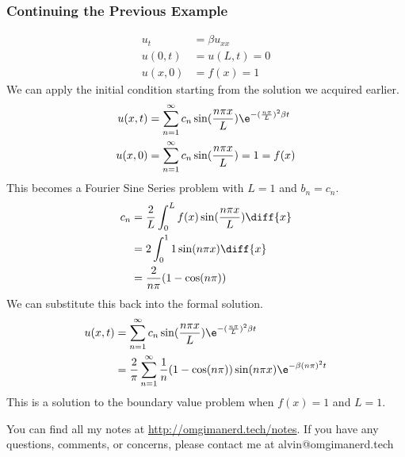 \documentclass{math}
\begin{document}
\subsubsection*{Continuing the Previous Example}
\begin{align*}
  u_t &= \beta u_{xx} \\
  u(0,t) &= u(L,t) = 0 \\
  u(x,0) &= f(x) = 1
\end{align*}
We can apply the initial condition starting from the solution we acquired
earlier.
\begin{align*}
  u(x,t) &= \sum_{n=1}^{\infty}c_n\sin(\frac{n\pi x}{L})
    \e^{-(\frac{n\pi}{L})^2\beta t} \\
  u(x,0) &= \sum_{n=1}^{\infty}c_n\sin(\frac{n\pi x}{L}) = 1 = f(x)
\end{align*}
This becomes a Fourier Sine Series problem with \( L = 1 \) and \( b_n = c_n \).
\begin{align*}
  c_n &= \frac{2}{L}\int_{0}^{L}f(x)\sin(\frac{n\pi x}{L})\diff{x} \\
  &= 2\int_{0}^{1}1\sin(n\pi x)\diff{x} \\
  &= \frac{2}{n\pi}(1-\cos(n\pi))
\end{align*}
We can substitute this back into the formal solution.
\begin{align*}
  u(x,t) &= \sum_{n=1}^{\infty}c_n\sin(\frac{n\pi x}{L})
    \e^{-(\frac{n\pi}{L})^2\beta t} \\
  &= \frac{2}{\pi}\sum_{n=1}^{\infty}\frac{1}{n}(1-\cos(n\pi))
    \sin(n\pi x)\e^{-\beta(n\pi)^2t}
\end{align*}
This is a solution to the boundary value problem when \( f(x) = 1 \) and
\( L = 1 \).

\begin{center}
  You can find all my notes at \url{http://omgimanerd.tech/notes}. If you have
  any questions, comments, or concerns, please contact me at
  alvin@omgimanerd.tech
\end{center}
\end{document}
